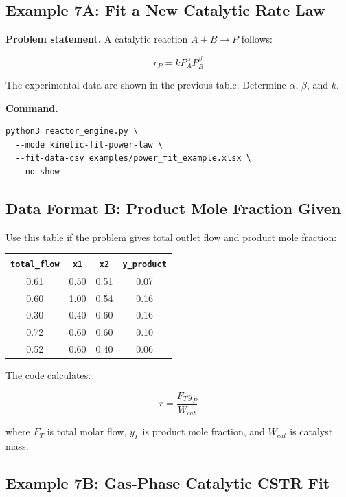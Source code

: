 \documentclass[11pt]{article}
\begin{document}
\subsection{Example 7A: Fit a New Catalytic Rate Law}

\textbf{Problem statement.} A catalytic reaction $A+B\to P$ follows:

\begin{equation}
r_P = kP_A^\alpha P_B^\beta
\end{equation}

The experimental data are shown in the previous table. Determine $\alpha$, $\beta$, and $k$.

\textbf{Command.}

\begin{lstlisting}
python3 reactor_engine.py \
  --mode kinetic-fit-power-law \
  --fit-data-csv examples/power_fit_example.xlsx \
  --no-show
\end{lstlisting}

\subsection{Data Format B: Product Mole Fraction Given}

Use this table if the problem gives total outlet flow and product mole fraction:

\begin{center}
\begin{tabular}{cccc}
\toprule
\texttt{total\_flow} & \texttt{x1} & \texttt{x2} & \texttt{y\_product} \\
\midrule
0.61 & 0.50 & 0.51 & 0.07 \\
0.60 & 1.00 & 0.54 & 0.16 \\
0.30 & 0.40 & 0.60 & 0.16 \\
0.72 & 0.60 & 0.60 & 0.10 \\
0.52 & 0.60 & 0.40 & 0.06 \\
\bottomrule
\end{tabular}
\end{center}

The code calculates:

\begin{equation}
r = \frac{F_T y_P}{W_{cat}}
\end{equation}

where $F_T$ is total molar flow, $y_P$ is product mole fraction, and $W_{cat}$ is catalyst mass.

\subsection{Example 7B: Gas-Phase Catalytic CSTR Fit}
\end{document}
